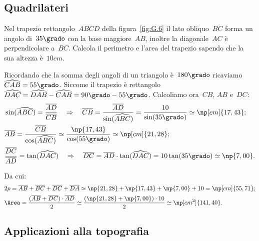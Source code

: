 \ovalbox{\risolvii \ref{ese:G.22}, \ref{ese:G.23}, \ref{ese:G.24}, \ref{ese:G.25}}

\subsection{Quadrilateri}

\begin{exrig}\vspace{1.10ex}
 \begin{esempio}
Nel trapezio rettangolo~$ABCD$ della figura~\ref{fig:G.6} il lato obliquo~$BC$ forma un angolo di~$35\grado$ con la base maggiore~$AB$, inoltre la diagonale~$AC$
è perpendicolare a~$BC$. Calcola il perimetro e l'area del trapezio sapendo che la sua altezza è~$10\unit{cm}$.

Ricordando che la somma degli angoli di un triangolo è~$180\grado$ ricaviamo~$\widehat{CAB}=55\grado$.
Siccome il trapezio è rettangolo
$\widehat{DAC}=\widehat{DAB}-\widehat{CAB}=90\grado-55\grado$.
Calcoliamo ora~$CB$, $AB$ e~$DC$:
\begin{align*}
&\sin(\widehat{ABC})=\frac{\overline{AD}}{\overline{CB}} \quad\Rightarrow\quad
    \overline{CB}=\frac{\overline{AD}}{\sin(\widehat{ABC})}=\frac{10}{\sin(35\grado)}\simeq \np[cm]{17,43};\\
&\overline{AB}=\frac{\overline{CB}}{\cos(\widehat{ABC})}\simeq \frac{\np{17,43}}{\cos(55\grado)}\simeq \np[cm]{21,28};\\
&\frac{\overline{DC}}{\overline{AD}}=\tan(\widehat{DAC}) \quad\Rightarrow\quad \overline{DC}=\overline{AD}\cdot\tan(\widehat{DAC})=10\tan(35\grado)\simeq \np{7,00}.
\end{align*}

Da cui:
\begin{align*}
&2p=\overline{AB}+\overline{BC}+\overline{DC}+\overline{DA}\simeq \np{21,28}+\np{17,43}+\np{7,00}+10 = \np[cm]{55,71};\\
&\Area=\frac{(\overline{AB}+\overline{DC})\cdot\overline{AD}}{2}\simeq \frac{(\np{21,28}+\np{7,00})\cdot 10}{2}\simeq \np[cm^2]{141,40}.
\end{align*}
 \end{esempio}
\end{exrig}

\ovalbox{\risolvii \ref{ese:G.26}, \ref{ese:G.27}, \ref{ese:G.28}, \ref{ese:G.29},\ref{ese:G.30}, \ref{ese:G.31}, \ref{ese:G.32}, \ref{ese:G.33}}

\subsection{Applicazioni alla topografia}

